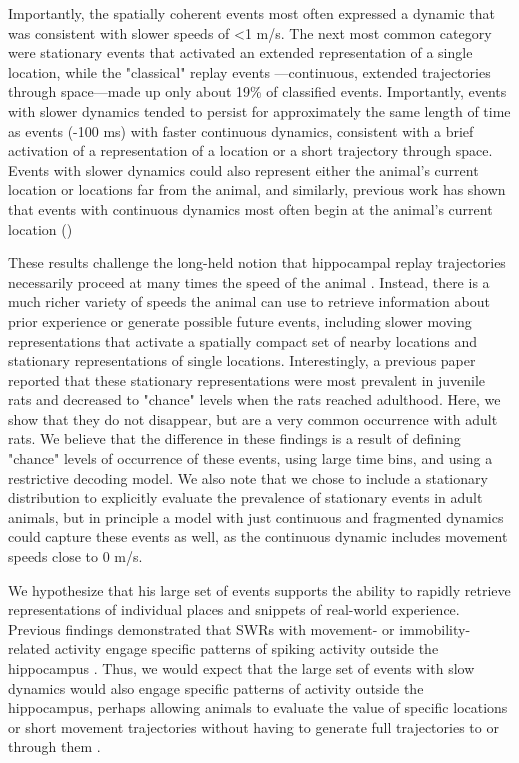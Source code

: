 \documentclass[times, twoside]{zHenriquesLab-StyleBioRxiv}
\begin{document}
Importantly, the spatially coherent events most often expressed a dynamic that was consistent with slower speeds of <1 m/s. The next most common category were stationary events \cite{JaiDistincthippocampalcorticalmemory2017, FarooqEmergencepreconfiguredplastic2019} that activated an extended representation of a single location, while the "classical" replay events ---continuous, extended trajectories through space---made up only about 19\% of classified events. Importantly, events with slower dynamics tended to persist for approximately the same length of time as events (-100 ms) with faster continuous dynamics, consistent with a brief activation of a representation of a location or a short trajectory through space. Events with slower dynamics could also represent either the animal's current location or locations far from the animal, and similarly, previous work has shown that events with continuous dynamics most often begin at the animal's current location (\cite{DavidsonHippocampalReplayExtended2009, KarlssonAwakereplayremote2009})

These results challenge the long-held notion that hippocampal replay trajectories necessarily proceed at many times the speed of the animal \cite{NadasdyReplayTimeCompression1999, LeeMemorySequentialExperience2002, DavidsonHippocampalReplayExtended2009}. Instead, there is a much richer variety of speeds the animal can use to retrieve information about prior experience or generate possible future events, including slower moving representations that activate a spatially compact set of nearby locations and stationary representations of single locations. Interestingly, a previous paper \cite{FarooqEmergencepreconfiguredplastic2019} reported that these stationary representations were most prevalent in juvenile rats and decreased to "chance" levels when the rats reached adulthood. Here, we show that they do not disappear, but are a very common occurrence with adult rats. We believe that the difference in these findings is a result of defining "chance" levels of occurrence of these events, using large time bins, and using a restrictive decoding model. We also note that we chose to include a stationary distribution to explicitly evaluate the prevalence of stationary events in adult animals, but in principle a model with just continuous and fragmented dynamics could capture these events as well, as the continuous dynamic includes movement speeds close to 0 m/s.

We hypothesize that his large set of events supports the ability to rapidly retrieve representations of individual places and snippets of real-world experience. Previous findings demonstrated that SWRs with movement- or immobility-related activity engage specific patterns of spiking activity outside the hippocampus \cite{JaiDistincthippocampalcorticalmemory2017, JadhavCoordinatedExcitationInhibition2016}. Thus, we would expect that the large set of events with slow dynamics would also engage specific patterns of activity outside the hippocampus, perhaps allowing animals to evaluate the value of specific locations or short movement trajectories without having to generate full trajectories to or through them \cite{YuHippocampalcorticalinteraction2015}. 
 
\end{document}
